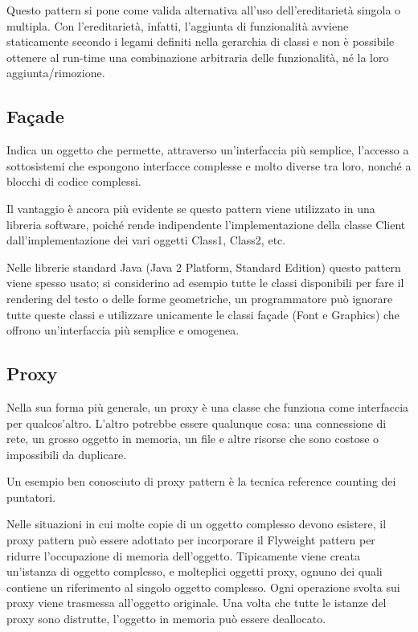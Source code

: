 Questo pattern si pone come valida alternativa all'uso dell'ereditarietà singola o multipla. Con l'ereditarietà, infatti, l'aggiunta di funzionalità avviene staticamente secondo i legami definiti nella gerarchia di classi e non è possibile ottenere al run-time una combinazione arbitraria delle funzionalità, né la loro aggiunta/rimozione.

\subsection{Façade}
Indica un oggetto che permette, attraverso un'interfaccia più semplice, l'accesso a sottosistemi che espongono interfacce complesse e molto diverse tra loro, nonché a blocchi di codice complessi.

Il vantaggio è ancora più evidente se questo pattern viene utilizzato in una libreria software, poiché rende indipendente l'implementazione della classe Client dall'implementazione dei vari oggetti Class1, Class2, etc.

Nelle librerie standard Java (Java 2 Platform, Standard Edition) questo pattern viene spesso usato; si considerino ad esempio tutte le classi disponibili per fare il rendering del testo o delle forme geometriche, un programmatore può ignorare tutte queste classi e utilizzare unicamente le classi façade (Font e Graphics) che offrono un'interfaccia più semplice e omogenea.

\subsection{Proxy}
Nella sua forma più generale, un proxy è una classe che funziona come interfaccia per qualcos'altro. L'altro potrebbe essere qualunque cosa: una connessione di rete, un grosso oggetto in memoria, un file e altre risorse che sono costose o impossibili da duplicare.

Un esempio ben conosciuto di proxy pattern è la tecnica reference counting dei puntatori.

Nelle situazioni in cui molte copie di un oggetto complesso devono esistere, il proxy pattern può essere adottato per incorporare il Flyweight pattern per ridurre l'occupazione di memoria dell'oggetto. Tipicamente viene creata un'istanza di oggetto complesso, e molteplici oggetti proxy, ognuno dei quali contiene un riferimento al singolo oggetto complesso. Ogni operazione svolta sui proxy viene trasmessa all'oggetto originale. Una volta che tutte le istanze del proxy sono distrutte, l'oggetto in memoria può essere deallocato.

